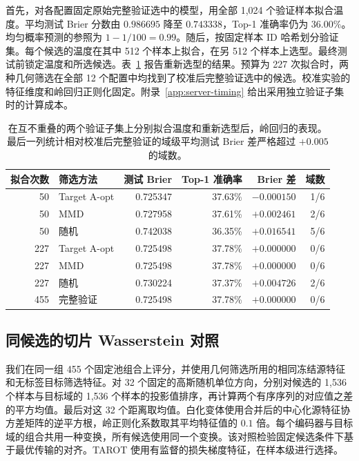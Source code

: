 \documentclass[UTF8,fontset=fandol,scheme=chinese,zihao=false,11pt,letterpaper]{ctexart}
\begin{document}
首先，对各配置固定原始完整验证选中的模型，用全部 1,024 个验证样本拟合温度。平均测试 Brier 分数由 $0.986695$ 降至 $0.743338$，Top-1 准确率仍为 $36.00\%$。均匀概率预测的参照为 $1-1/100=0.99$。随后，按固定样本 ID 哈希划分验证集。每个候选的温度在其中 512 个样本上拟合，在另 512 个样本上选型。最终测试前锁定温度和所选候选。表~\ref{tab:ridge-calibration} 报告重新选型的结果。预算为 227 次拟合时，两种几何筛选在全部 12 个配置中均找到了校准后完整验证选中的候选。校准实验的特征维度和岭回归正则化固定。附录~\ref{app:server-timing} 给出采用独立验证子集时的计算成本。

\begin{table}[ht]
\centering
\caption{在互不重叠的两个验证子集上分别拟合温度和重新选型后，岭回归的表现。最后一列统计相对校准后完整验证的域级平均测试 Brier 差严格超过 $+0.005$ 的域数。}
\label{tab:ridge-calibration}
\begin{tabular}{rlrrrr}
\toprule
拟合次数 & 筛选方法 & 测试 Brier & Top-1 准确率 & Brier 差 & 域数 \\
\midrule
50 & Target A-opt & 0.725347 & 37.63\% & $-0.000150$ & 1/6 \\
50 & MMD          & 0.727958 & 37.61\% & $+0.002461$ & 2/6 \\
50 & 随机       & 0.742038 & 36.35\% & $+0.016541$ & 5/6 \\
227 & Target A-opt & 0.725498 & 37.78\% & $+0.000000$ & 0/6 \\
227 & MMD          & 0.725498 & 37.78\% & $+0.000000$ & 0/6 \\
227 & 随机       & 0.730224 & 37.37\% & $+0.004726$ & 2/6 \\
455 & 完整验证 & 0.725498 & 37.78\% & $+0.000000$ & 0/6 \\
\bottomrule
\end{tabular}
\end{table}

\subsection{同候选的切片 Wasserstein 对照}
\label{app:transport-fixed}
我们在同一组 455 个固定池组合上评分，并使用几何筛选所用的相同冻结源特征和无标签目标筛选特征。对 32 个固定的高斯随机单位方向，分别对候选的 1,536 个样本与目标域的 1,536 个样本的投影值排序，再计算两个有序序列的对应值之差的平方均值。最后对这 32 个距离取均值。白化变体使用合并后的中心化源特征协方差矩阵的逆平方根，岭正则化系数取其平均特征值的 $0.1$ 倍。每个编码器与目标域的组合共用一种变换，所有候选使用同一个变换。该对照检验固定候选条件下基于最优传输的对齐。TAROT \citep{feng2025tarot} 使用有监督的损失梯度特征，在样本级进行选择。
\end{document}
